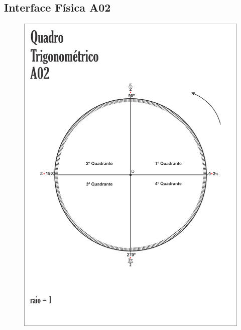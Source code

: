 \subsection{Interface Física A02}\label{subsection:atividade3_A02}
\begin{figure}[htb]
	\centering
	\includegraphics[width=0.9\linewidth]{chapters/appendixLesson/Interface_A02.png}
\end{figure}
\clearpage

